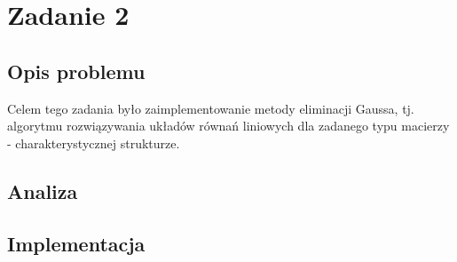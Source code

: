 \section{Zadanie 2}
\subsection{Opis problemu}
Celem tego zadania było zaimplementowanie metody eliminacji Gaussa, tj. algorytmu rozwiązywania układów równań liniowych dla zadanego typu macierzy - charakterystycznej strukturze. \\
\subsection{Analiza}

\subsection{Implementacja}
